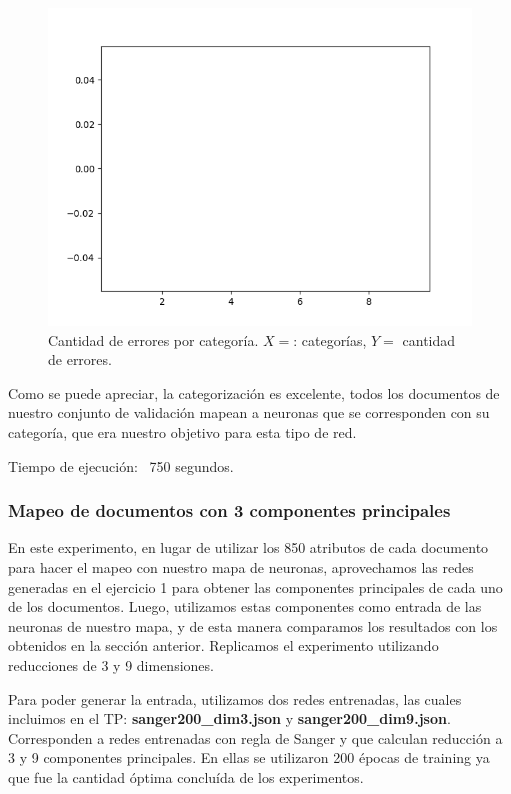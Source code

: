 \begin{figure}[!htbp]
  \begin{center}
    \includegraphics[scale=0.6]{../img/map7x7_1000ep_850en_sigma7_faseord750_corregido_errores.png}
  \caption{Cantidad de errores por categoría. $X=$: categorías, $Y=$ cantidad de errores.}
  \end{center}
\end{figure}

Como se puede apreciar, la categorización es excelente, todos los documentos de nuestro conjunto de validación mapean a neuronas que se corresponden con su categoría, que era nuestro objetivo para esta tipo de red.

Tiempo de ejecución: ~750 segundos.

\subsubsection{Mapeo de documentos con 3 componentes principales}

En este experimento, en lugar de utilizar los 850 atributos de cada documento para hacer el mapeo con nuestro mapa de neuronas, aprovechamos las redes generadas en el ejercicio 1 para obtener las componentes principales de cada uno de los documentos. Luego, utilizamos estas componentes como entrada de las neuronas de nuestro mapa, y de esta manera comparamos los resultados con los obtenidos en la sección anterior. Replicamos el experimento utilizando reducciones de 3 y 9 dimensiones.

Para poder generar la entrada, utilizamos dos redes entrenadas, las cuales incluimos en el TP: \textbf{sanger200\_dim3.json} y \textbf{sanger200\_dim9.json}. Corresponden a redes entrenadas con regla de Sanger y que calculan reducción a 3 y 9 componentes principales. En ellas se utilizaron 200 épocas de training ya que fue la cantidad óptima concluída de los experimentos.

